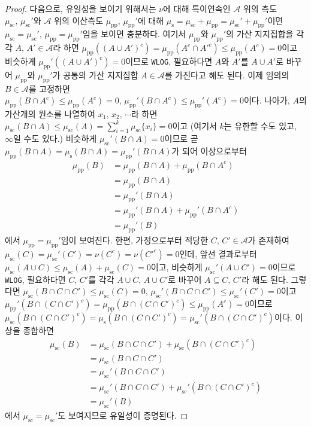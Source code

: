 \begin{proof}
    다음으로, 유일성을 보이기 위해서는 $\nu$에 대해 특이연속인 $\mathcal{A}$ 위의 측도 $\mu_\mathrm{sc},\,\mu_\mathrm{sc}'$와 $\mathcal{A}$ 위의 이산측도 $\mu_\mathrm{pp},\,\mu_\mathrm{pp}'$에 대해 $\mu_\mathrm{s}=\mu_\mathrm{sc}+\mu_\mathrm{pp}=\mu_\mathrm{sc}'+\mu_\mathrm{pp}'$이면 $\mu_\mathrm{sc}=\mu_\mathrm{sc}',\,\mu_\mathrm{pp}=\mu_\mathrm{pp}'$임을 보이면 충분하다. 여기서 $\mu_\mathrm{pp}$와 $\mu_\mathrm{pp}'$의 가산 지지집합을 각각 $A,\,A'\in\mathcal{A}$라 하면 $\mu_\mathrm{pp}((A\cup A')^c)=\mu_\mathrm{pp}(A^c\cap A'^c)\leq\mu_\mathrm{pp}(A^c)=0$이고 비슷하게 $\mu_\mathrm{pp}'((A\cup A')^c)=0$이므로 \texttt{WLOG}, 필요하다면 $A$와 $A'$를 $A\cup A'$로 바꾸어 $\mu_\mathrm{pp}$와 $\mu_\mathrm{pp}'$가 공통의 가산 지지집합 $A\in\mathcal{A}$를 가진다고 해도 된다. 이제 임의의 $B\in\mathcal{A}$를 고정하면 $\mu_\mathrm{pp}(B\cap A^c)\leq\mu_\mathrm{pp}(A^c)=0,\,\mu_\mathrm{pp}'(B\cap A^c)\leq\mu_\mathrm{pp}'(A^c)=0$이다. 나아가, $A$의 가산개의 원소를 나열하여 $x_1,\,x_2,\,\cdots$라 하면 $\mu_\mathrm{sc}(B\cap A)\leq\mu_\mathrm{sc}(A)=\sum_{i=1}^k\mu_\mathrm{sc}\{x_i\}=0$이고 (여기서 $k$는 유한할 수도 있고, $\infty$일 수도 있다.) 비슷하게 $\mu_\mathrm{sc}'(B\cap A)=0$이므로 곧 $\mu_\mathrm{pp}(B\cap A)=\mu_\mathrm{s}(B\cap A)=\mu_\mathrm{pp}'(B\cap A)$가 되어 이상으로부터
    \begin{align*}
        \mu_\mathrm{pp}(B)&=\mu_\mathrm{pp}(B\cap A)+\mu_\mathrm{pp}(B\cap A^c)\\
        &=\mu_\mathrm{pp}(B\cap A)\\
        &=\mu_\mathrm{pp}'(B\cap A)\\
        &=\mu_\mathrm{pp}'(B\cap A)+\mu_\mathrm{pp}'(B\cap A^c)\\
        &=\mu_\mathrm{pp}'(B)
    \end{align*}
    에서 $\mu_\mathrm{pp}=\mu_\mathrm{pp}'$임이 보여진다. 한편, 가정으로부터 적당한 $C,\,C'\in\mathcal{A}$가 존재하여 $\mu_\mathrm{sc}(C)=\mu_\mathrm{sc}'(C')=\nu(C^c)=\nu(C'^c)=0$인데, 앞선 결과로부터 $\mu_\mathrm{sc}(A\cup C)\leq\mu_\mathrm{sc}(A)+\mu_\mathrm{sc}(C)=0$이고, 비슷하게 $\mu_\mathrm{sc}'(A\cup C')=0$이므로 \texttt{WLOG}, 필요하다면 $C,\,C'$를 각각 $A\cup C,\,A\cup C'$로 바꾸어 $A\subseteq C,\,C'$라 해도 된다. 그렇다면 $\mu_\mathrm{sc}(B\cap C\cap C')\leq\mu_\mathrm{sc}(C)=0,\,\mu_\mathrm{sc}'(B\cap C\cap C')\leq\mu_\mathrm{sc}'(C')=0$이고 $\mu_\mathrm{pp}'(B\cap(C\cap C')^c)=\mu_\mathrm{pp}(B\cap(C\cap C')^c)\leq\mu_\mathrm{pp}(A^c)=0$이므로 $\mu_\mathrm{sc}(B\cap(C\cap C')^c)=\mu_\mathrm{s}(B\cap(C\cap C')^c)=\mu_\mathrm{sc}'(B\cap(C\cap C')^c)$이다. 이상을 종합하면
    \begin{align*}
        \mu_\mathrm{sc}(B)&=\mu_\mathrm{sc}(B\cap C\cap C')+\mu_\mathrm{sc}(B\cap(C\cap C')^c)\\
        &=\mu_\mathrm{sc}(B\cap C\cap C')\\
        &=\mu_\mathrm{sc}'(B\cap C\cap C')\\
        &=\mu_\mathrm{sc}'(B\cap C\cap C')+\mu_\mathrm{sc}'(B\cap(C\cap C')^c)\\
        &=\mu_\mathrm{sc}'(B)
    \end{align*}
    에서 $\mu_\mathrm{sc}=\mu_\mathrm{sc}'$도 보여지므로 유일성이 증명된다.
\end{proof}

